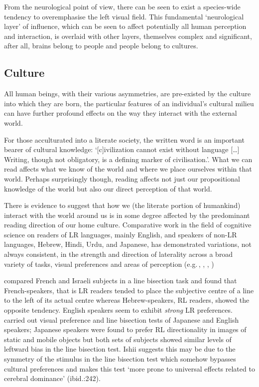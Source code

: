 \documentclass[11pt, oneside, a4paper]{scrartcl}
\begin{document}
From the neurological point of view, there can be seen to exist a species-wide tendency to overemphasise the left visual field. This fundamental `neurological layer' of influence, which can be seen to affect potentially all human perception and interaction, is overlaid with other layers, themselves complex and significant, after all, brains belong to people and people belong to cultures. 

\subsection{Culture}

All human beings, with their various asymmetries, are pre-existed by the culture into which they are born, the particular features of an individual's cultural milieu can have further profound effects on the way they interact with the external world.

For those acculturated into a literate society, the written word is an important bearer of cultural knowledge: `[c]ivilization cannot exist without language [\ldots] Writing, though not obligatory, is a defining marker of civilisation.'\citep[1]{Robinson:2009}. What we can read affects what we know of the world and where we place ourselves within that world. Perhaps surprisingly though, reading affects not just our propositional knowledge of the world but also our direct perception of that world.

There is evidence to suggest that how we (the literate portion of humankind) interact with the world around us is in some degree affected by the predominant reading direction of our home culture. Comparative work in the field of cognitive science on readers of LR languages, mainly English, and speakers of non-LR languages, Hebrew, Hindi, Urdu, and Japanese, has demonstrated variations, not always consistent, in the strength and direction of laterality across a broad variety of tasks, visual preferences and areas of perception (e.g.\,\citet{Ishii:2011}, \citet{Kazandjian:2010}, \citet{Tversky:1991}, \citet{Vaid:1989}) 

\citet{Chokron:1993} compared French and Israeli subjects in a line bisection task and found that French-speakers, that is LR readers tended to place the subjective centre of a line to the left of its actual centre whereas Hebrew-speakers, RL readers, showed the opposite tendency. English speakers seem to exhibit \emph{strong }LR preferences. \citet{Ishii:2011} carried out visual preference and line bisection tests of Japanese and English speakers; Japanese speakers were found to prefer RL directionality in images of static and mobile objects but both sets of subjects showed similar levels of leftward bias in the line bisection test. Ishii suggests this may be due to the symmetry of the stimulus in the line bisection test which somehow bypasses cultural preferences and makes this test `more prone to universal effects related to cerebral dominance' (ibid.:242). 
\end{document}
